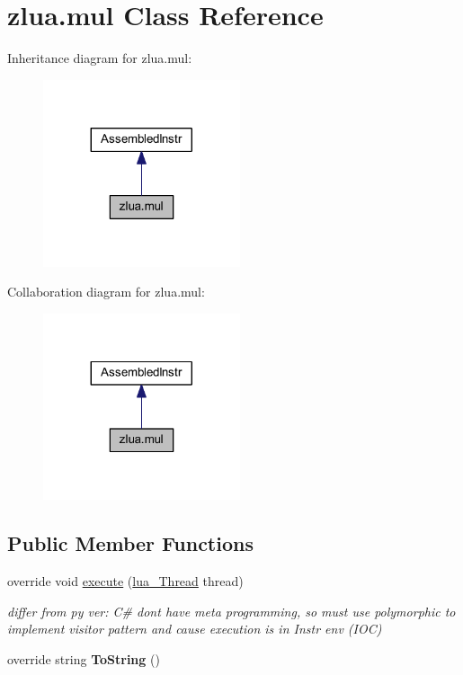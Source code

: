 \hypertarget{classzlua_1_1mul}{}\section{zlua.\+mul Class Reference}
\label{classzlua_1_1mul}


Inheritance diagram for zlua.\+mul\+:
\nopagebreak
\begin{figure}[H]
\begin{center}
\leavevmode
\includegraphics[width=164pt]{classzlua_1_1mul__inherit__graph}
\end{center}
\end{figure}


Collaboration diagram for zlua.\+mul\+:
\nopagebreak
\begin{figure}[H]
\begin{center}
\leavevmode
\includegraphics[width=164pt]{classzlua_1_1mul__coll__graph}
\end{center}
\end{figure}
\subsection*{Public Member Functions}
\begin{DoxyCompactItemize}
\item 
override void \mbox{\hyperlink{classzlua_1_1mul_a22002ab020aaabcf37eddae16b6ba10a}{execute}} (\mbox{\hyperlink{classzlua_1_1lua___thread}{lua\+\_\+\+Thread}} thread)
\begin{DoxyCompactList}\small\item\em differ from py ver\+: C\# dont have meta programming, so must use polymorphic to implement visitor pattern and cause execution is in Instr env (I\+OC) \end{DoxyCompactList}\item 
\mbox{\label{classzlua_1_1mul_a17eb2965f4186881cb5ad9f0e8981307}} 
override string {\bfseries To\+String} ()
\end{DoxyCompactItemize}
